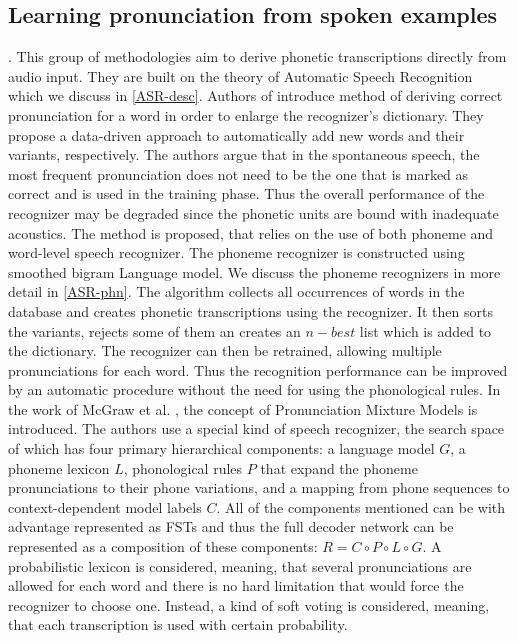 \subsection{Learning pronunciation from spoken examples}.
\label{pronunc-spoken}
This group of methodologies aim to derive phonetic transcriptions directly from audio input.
They are built on the theory of Automatic Speech Recognition which we discuss in \ref{ASR-desc}.
Authors of \cite{slobada1996dictionary} introduce method of deriving correct pronunciation for a word in order to enlarge the recognizer's dictionary.
They propose a data-driven approach to automatically add new words and their variants, respectively.
The authors argue that in the spontaneous speech, the most frequent pronunciation does not need to be the one that is marked as correct and is used in the training phase.
Thus the overall performance of the recognizer may be degraded since the phonetic units are bound with inadequate acoustics.
The method is proposed, that relies on the use of both phoneme and word-level speech recognizer.
The phoneme recognizer is constructed using smoothed bigram Language model.
We discuss the phoneme recognizers in more detail in \ref{ASR-phn}.
The algorithm collects all occurrences of words in the database and creates phonetic transcriptions using the recognizer.
It then sorts the variants, rejects some of them an creates an $n-best$ list which is added to the dictionary.
The recognizer can then be retrained, allowing multiple pronunciations for each word.
Thus the recognition performance can be improved by an automatic procedure without the need for using the phonological rules.
\linebreak\linebreak
In the work of McGraw et al. \cite{mcgraw2013learning}, the concept of Pronunciation Mixture Models is introduced.
The authors use a special kind of speech recognizer, the search space of which has four primary hierarchical components: a language model $G$, a phoneme lexicon $L$, phonological rules $P$ that expand the phoneme pronunciations to their phone variations, and a mapping from phone sequences to context-dependent model labels
$C$.
All of the components mentioned can be with advantage represented as FSTs and thus the full decoder network can be represented as a composition of these components: $R = C\circ P \circ L \circ G$.
A probabilistic lexicon is considered, meaning, that several pronunciations are allowed for each word and there is no hard limitation that would force the recognizer to choose one.
Instead, a kind of soft voting is considered, meaning, that each transcription is used with certain probability.
